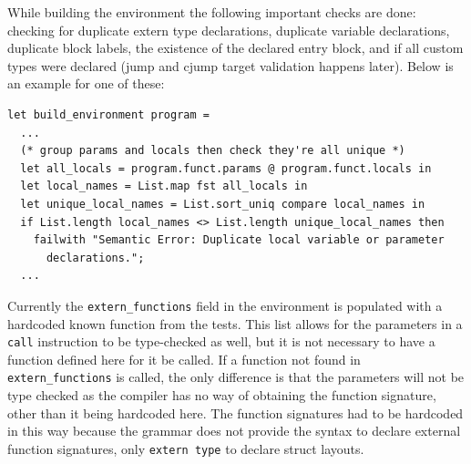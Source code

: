 \documentclass[11pt, a4paper]{article}
\begin{document}
While building the environment the following important checks are done: checking for duplicate extern type declarations, duplicate variable declarations, duplicate block labels,
the existence of the declared entry block, and if all custom types were declared (jump and cjump target validation happens later). Below is an example for one of these:

\medskip

\begin{lstlisting}[language={[Objective]Caml}]
let build_environment program =
  ...
  (* group params and locals then check they're all unique *)
  let all_locals = program.funct.params @ program.funct.locals in
  let local_names = List.map fst all_locals in
  let unique_local_names = List.sort_uniq compare local_names in
  if List.length local_names <> List.length unique_local_names then
    failwith "Semantic Error: Duplicate local variable or parameter 
      declarations.";
  ...
\end{lstlisting}

\medskip

Currently the \texttt{extern\_functions} field in the environment is populated with a hardcoded known function from the tests. This list allows for the parameters in a \texttt{call}
instruction to be type-checked as well, but it is not necessary to have a function defined here for it be called. If a function not found in \texttt{extern\_functions} is called, 
the only difference is that the parameters will not be type checked as the compiler has no way of obtaining the function signature, other than it being hardcoded here. The function signatures
had to be hardcoded in this way because the grammar does not provide the syntax to declare external function signatures, only \texttt{extern type} to declare struct layouts.

\medskip
\end{document}
